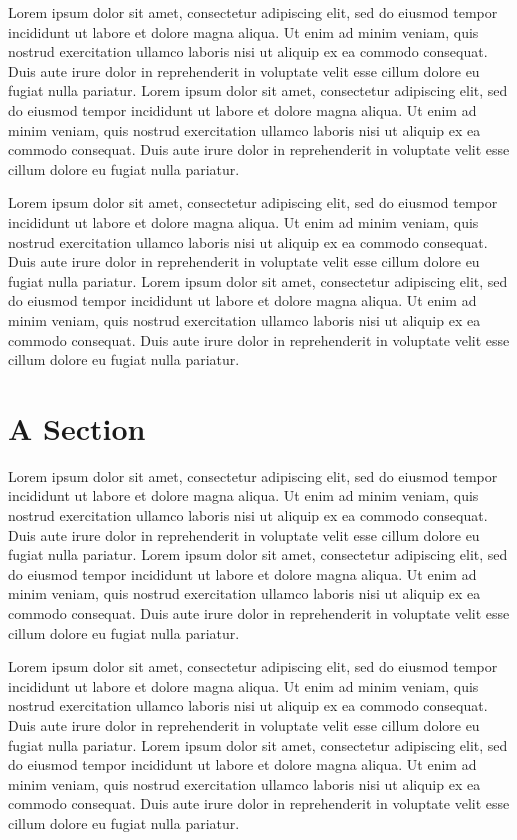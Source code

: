 \documentclass{book}
\begin{document}
Lorem ipsum dolor sit amet, consectetur adipiscing elit, sed do eiusmod tempor incididunt ut labore et dolore magna aliqua. Ut enim ad minim veniam, quis nostrud exercitation ullamco laboris nisi ut aliquip ex ea commodo consequat. Duis aute irure dolor in reprehenderit in voluptate velit esse cillum dolore eu fugiat nulla pariatur. Lorem ipsum dolor sit amet, consectetur adipiscing elit, sed do eiusmod tempor incididunt ut labore et dolore magna aliqua. Ut enim ad minim veniam, quis nostrud exercitation ullamco laboris nisi ut aliquip ex ea commodo consequat. Duis aute irure dolor in reprehenderit in voluptate velit esse cillum dolore eu fugiat nulla pariatur.

Lorem ipsum dolor sit amet, consectetur adipiscing elit, sed do eiusmod tempor incididunt ut labore et dolore magna aliqua. Ut enim ad minim veniam, quis nostrud exercitation ullamco laboris nisi ut aliquip ex ea commodo consequat. Duis aute irure dolor in reprehenderit in voluptate velit esse cillum dolore eu fugiat nulla pariatur. Lorem ipsum dolor sit amet, consectetur adipiscing elit, sed do eiusmod tempor incididunt ut labore et dolore magna aliqua. Ut enim ad minim veniam, quis nostrud exercitation ullamco laboris nisi ut aliquip ex ea commodo consequat. Duis aute irure dolor in reprehenderit in voluptate velit esse cillum dolore eu fugiat nulla pariatur.

\section{A Section}
Lorem ipsum dolor sit amet, consectetur adipiscing elit, sed do eiusmod tempor incididunt ut labore et dolore magna aliqua. Ut enim ad minim veniam, quis nostrud exercitation ullamco laboris nisi ut aliquip ex ea commodo consequat. Duis aute irure dolor in reprehenderit in voluptate velit esse cillum dolore eu fugiat nulla pariatur. Lorem ipsum dolor sit amet, consectetur adipiscing elit, sed do eiusmod tempor incididunt ut labore et dolore magna aliqua. Ut enim ad minim veniam, quis nostrud exercitation ullamco laboris nisi ut aliquip ex ea commodo consequat. Duis aute irure dolor in reprehenderit in voluptate velit esse cillum dolore eu fugiat nulla pariatur.

Lorem ipsum dolor sit amet, consectetur adipiscing elit, sed do eiusmod tempor incididunt ut labore et dolore magna aliqua. Ut enim ad minim veniam, quis nostrud exercitation ullamco laboris nisi ut aliquip ex ea commodo consequat. Duis aute irure dolor in reprehenderit in voluptate velit esse cillum dolore eu fugiat nulla pariatur. Lorem ipsum dolor sit amet, consectetur adipiscing elit, sed do eiusmod tempor incididunt ut labore et dolore magna aliqua. Ut enim ad minim veniam, quis nostrud exercitation ullamco laboris nisi ut aliquip ex ea commodo consequat. Duis aute irure dolor in reprehenderit in voluptate velit esse cillum dolore eu fugiat nulla pariatur.
\end{document}
